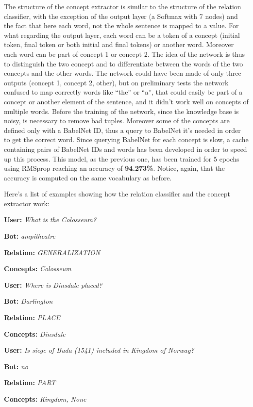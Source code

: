 \documentclass[paper=a4, fontsize=11pt]{scrartcl} %
\numberwithin{equation}{section} %
\numberwithin{figure}{section} %
\numberwithin{table}{section} %
\theoremstyle{definition}
\begin{document}
The structure of the concept extractor is similar to the structure of the
relation classifier, with the exception of the output layer (a Softmax with
7 nodes) and the fact that here each word, not the whole sentence is mapped to a value.
For what regarding the output layer, each word can be a token of a
concept (initial token, final token or both initial and final tokens) or another
word. Moreover each word can be part of concept 1 or concept 2. The idea of the
network is thus to distinguish the two concept and to differentiate between the
words of the two concepts and the other words. The network could have been
made of only three outputs (concept 1, concept 2, other), but on preliminary
tests the network confused to map correctly words like ``the'' or ``a'', that
could easily be part of a concept or another element of the sentence,
and it didn't work well on concepts
of multiple words. Before the training of the network, since the knowledge
base is noisy, is necessary to remove bad tuples. Moreover some of the
concepts are defined only with a BabelNet ID, thus a query to BabelNet it's
needed in order to get the correct word. Since querying BabelNet for each
concept is slow, a cache containing pairs of BabelNet IDs and words has been
developed in order to speed up this process. This model, as the previous one,
has been trained for 5 epochs using RMSprop reaching an accuracy of \textbf{94.273\%}.
Notice, again, that the accuracy is computed on the same vocabulary as before.

Here's a list of examples showing how the relation classifier and the concept
extractor work:

\textbf{User:} \textit{What is the Colosseum?}

\textbf{Bot:} \textit{ampitheatre}

\textbf{Relation:} \textit{GENERALIZATION}

\textbf{Concepts:} \textit{Colosseum}

\textbf{User:} \textit{Where is Dinsdale placed?}

\textbf{Bot:} \textit{Darlington}

\textbf{Relation:} \textit{PLACE}

\textbf{Concepts:} \textit{Dinsdale}

\textbf{User:} \textit{Is siege of Buda (1541) included in Kingdom of Norway?}

\textbf{Bot:} \textit{no}

\textbf{Relation:} \textit{PART}

\textbf{Concepts:} \textit{Kingdom, None}
\end{document}
